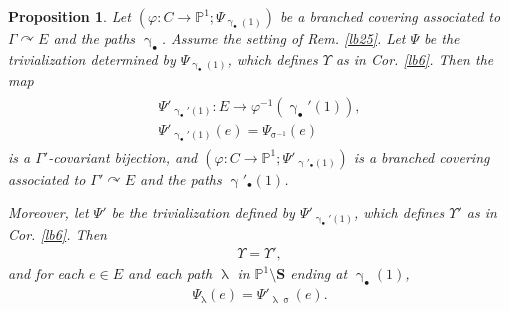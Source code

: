 \documentclass[12pt,a4paper,notitlepage]{article}
\theoremstyle{definition}
\theoremstyle{plain}
\newtheorem{pp}[df]{Proposition}
\newcommand{\blt}{\bullet}
\newcommand{\Pbb}{\mathbb P}
\newcommand{\Sbf}{\mathbf{S}}
\numberwithin{equation}{subsection}
\begin{document}
\begin{pp}\label{lb26}
Let $(\varphi:C\rightarrow\Pbb^1;\Psi_{\upgamma_\blt(1)})$ be a branched covering associated to $\Gamma\curvearrowright E$ and the paths $\upgamma_\blt$. Assume the setting of Rem. \ref{lb25}. Let $\Psi$ be the trivialization determined by $\Psi_{\upgamma_\blt(1)}$, which defines $\Upsilon$ as in Cor. \ref{lb6}. Then the map
\begin{gather}\label{eq70}
\begin{array}{c}
	\Psi'_{\upgamma_\blt'(1)}:E\rightarrow \varphi^{-1}(\upgamma_\blt'(1)),\\[0.8ex]
	\Psi'_{\upgamma_\blt'(1)}(e)=\Psi_{\upsigma^{-1}}(e)
\end{array}	
\end{gather}
is a $\Gamma'$-covariant bijection, and $(\varphi:C\rightarrow\Pbb^1;\Psi'_{\upgamma'_\blt(1)})$ is a branched covering associated to $\Gamma'\curvearrowright E$ and the paths ${\upgamma'_\blt(1)}$.

Moreover, let $\Psi'$ be the trivialization defined by $\Psi'_{\upgamma_\blt'(1)}$, which defines $\Upsilon'$ as in Cor. \ref{lb6}. Then
\begin{align*}
\Upsilon=\Upsilon',	
\end{align*}
and for each $e\in E$ and each path $\uplambda$ in $\Pbb^1\setminus\Sbf$ ending at $\upgamma_\blt(1)$, 
\begin{gather}
\Psi_{\uplambda}(e)=\Psi'_{\uplambda\upsigma}(e).	\label{eq52}
\end{gather}
\end{pp}
\end{document}
